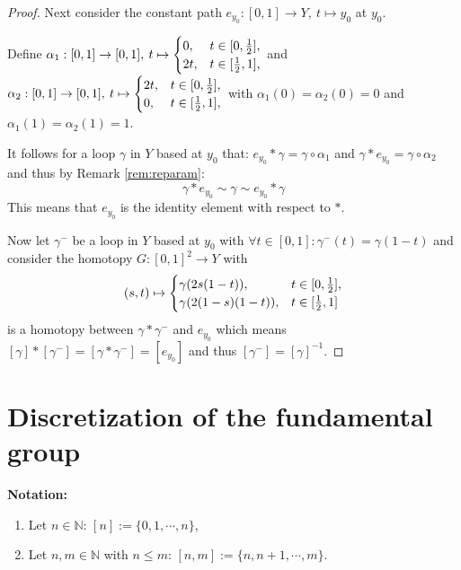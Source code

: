 \documentclass[a4paper, 11pt, twoside]{article}
\newcommand{\N}[0]{\mathbb{N}}
\theoremstyle{break}
\theoremstyle{break}
\begin{document}
\begin{proof}
  Next consider the constant path $e_{y_0}: [0,1] \to Y, \: t \mapsto y_0$ at $y_0$. 
  
  \vspace*{5pt}
  Define $\alpha_1: [0,1] \to [0,1], \: t \mapsto \begin{cases}
    0, &t\in[0, {1\over2}],\\
    2t, &t\in[{1\over2}, 1],
  \end{cases}$ and $\alpha_2: [0,1]\to [0,1], \: t \mapsto \begin{cases}
    2t, &t\in[0, {1\over2}],\\
    0, &t\in[{1\over2}, 1],
  \end{cases}$
  \vspace*{5pt}
  with $\alpha_1(0) = \alpha_2(0) = 0$ and $\alpha_1(1) = \alpha_2(1) = 1$.

  It follows for a loop $\gamma$ in $Y$ based at $y_0$ that: $e_{y_0} * \gamma = \gamma \circ \alpha_1$ and $\gamma * e_{y_0} = \gamma \circ \alpha_2$ and thus by Remark \ref{rem:reparam}:
  \begin{equation*}
    \gamma * e_{y_0} \sim \gamma \sim e_{y_0} * \gamma
  \end{equation*}
  This means that $e_{y_0}$ is the identity element with respect to $*$.

  Now let $\gamma^-$ be a loop in $Y$ based at $y_0$ with $\forall t \in [0,1]: \gamma^-(t) = \gamma(1 - t)$ and consider the homotopy $G: [0,1]^2 \to Y$ with 
  \begin{equation*}
    (s, t) \mapsto \begin{cases}
      \gamma(2s(1-t)), &t \in [0, {1\over2}], \\
      \gamma(2(1-s)(1-t)), &t \in [{1\over2}, 1] 
    \end{cases}
  \end{equation*}
  is a homotopy between $\gamma * \gamma^-$ and $e_{y_0}$ which means $[\gamma] * [\gamma^-] = [\gamma * \gamma^-] = [e_{y_0}]$ and thus $[\gamma^-] = [\gamma]^{-1}$. 
\end{proof}

\section{Discretization of the fundamental group}
\textbf{Notation:}
\begin{enumerate}
  \item Let $n \in \N$: $[n] := \{0, 1, \cdots, n\}$,
  \item Let $n,m \in \N$ with $n \leq m$: $[n,m] := \{n, n+1, \cdots, m\}$.
\end{enumerate}
\end{document}
